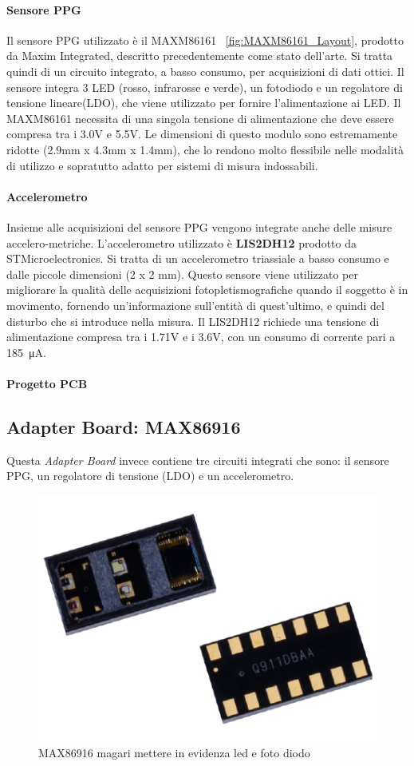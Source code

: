 \paragraph{Sensore PPG} Il sensore PPG utilizzato è il MAXM86161 \Fig~\ref{fig:MAXM86161_Layout}, prodotto da Maxim Integrated, descritto precedentemente come stato dell'arte. Si tratta quindi di un circuito integrato, a basso consumo, per acquisizioni di dati ottici. Il sensore integra 3 LED (rosso, infrarosse e verde), un fotodiodo e un regolatore di tensione lineare(LDO), che viene utilizzato per fornire l'alimentazione ai LED. Il MAXM86161 necessita di una singola tensione di alimentazione che deve essere compresa tra i 3.0V e 5.5V. Le dimensioni di questo modulo sono estremamente ridotte (2.9mm x 4.3mm x 1.4mm), che lo rendono molto flessibile nelle modalità di utilizzo e sopratutto adatto per sistemi di misura indossabili.

\paragraph{Accelerometro} Insieme alle acquisizioni del sensore PPG vengono integrate anche delle misure accelero-metriche. L'accelerometro utilizzato è \textbf{LIS2DH12} \cite{STMicroelectronicsLIS2DH12} prodotto da STMicroelectronics. Si tratta di un accelerometro triassiale a basso consumo e dalle piccole dimensioni (2 x 2 mm). Questo sensore viene utilizzato per migliorare la qualità delle acquisizioni fotopletismografiche quando il soggetto è in movimento, fornendo un'informazione sull'entità di quest'ultimo, e quindi del disturbo che si introduce nella misura. Il LIS2DH12 richiede una tensione di alimentazione compresa tra i 1.71V e i 3.6V, con un consumo di corrente pari a \SI{185}{\micro\ampere}.

\paragraph{Progetto PCB}

\subsection{Adapter Board: MAX86916}
Questa \textit{Adapter Board} invece contiene tre circuiti integrati che sono: il sensore PPG, un regolatore di tensione (LDO) e un accelerometro.
\begin{figure}[h]
	\centering
	\includegraphics[width=0.6\linewidth]{ImageFiles/Hardware/MAX86916_Layout}
	\caption{MAX86916 magari mettere in evidenza led e foto diodo}
	\label{fig:MAX86916_Layout}
\end{figure}

